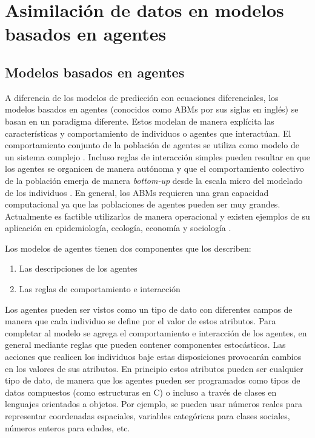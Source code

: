 \chapter{Asimilación de datos en modelos basados en agentes} \label{chp:da_abms}

\section{Modelos basados en agentes}

A diferencia de los modelos de predicción con ecuaciones diferenciales, los modelos basados en agentes (conocidos como ABMs por sus siglas en inglés) se basan en un paradigma diferente. Estos modelan de manera explícita las características y comportamiento de individuos o agentes que interactúan. El comportamiento conjunto de la población de agentes se utiliza como modelo de un sistema complejo \citep{Bonabeau2002}. Incluso reglas de interacción simples pueden resultar en que los agentes se organicen de manera autónoma y que el comportamiento colectivo de la población emerja de manera \textit{bottom-up} desde la escala micro del modelado de los individuos \citep{Helbing2012}. En general, los ABMs requieren una gran capacidad computacional ya que las poblaciones de agentes pueden ser muy grandes. Actualmente es factible utilizarlos de manera operacional y existen ejemplos de su aplicación en epidemiología, ecología, economía y sociología \citep{Vynnycky2010, Grimm2005, Tesfatsion2006, Epstein1996}.

Los modelos de agentes tienen dos componentes que los describen: 
\begin{enumerate}
    \item Las descripciones de los agentes
    \item Las reglas de comportamiento e interacción
\end{enumerate}
Los agentes pueden ser vistos como un tipo de dato con diferentes campos de manera que cada individuo se define por el valor de estos atributos. Para completar al modelo se agrega el comportamiento e interacción de los agentes, en general mediante reglas que pueden contener componentes estocásticos. Las acciones que realicen los individuos baje estas disposiciones provocarán cambios en los valores de sus atributos. En principio estos atributos pueden ser cualquier tipo de dato, de manera que los agentes pueden ser programados como tipos de datos compuestos (como estructuras en C) o incluso a través de clases en lenguajes orientados a objetos. Por ejemplo, se pueden usar números reales para representar coordenadas espaciales, variables categóricas para clases sociales, números enteros para edades, etc.

